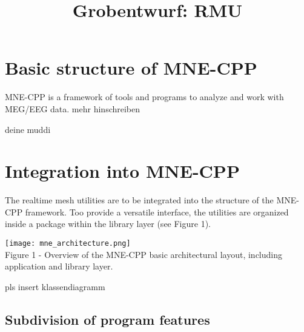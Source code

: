 \documentclass[a4paper, 11pt, ngerman, fleqn]{article}
\begin{document}
	
\title{Grobentwurf: RMU}
\vspace{3 in}
\maketitle
\clearpage

\tableofcontents

\clearpage
\section{Basic structure of MNE-CPP}

MNE-CPP is a framework of tools and programs to analyze and work with MEG/EEG data.
mehr hinschreiben 

\begin{description}
	\item[deine muddi]

\end{description}

\clearpage

\section{Integration into MNE-CPP}

The realtime mesh utilities are to be integrated into the structure of the MNE-CPP framework. Too provide a versatile interface, the utilities are organized inside a package within the library layer (see Figure 1).

\begin{center}
	\texttt{[image: mne\_architecture.png]}
	\\
	{Figure 1 - Overview of the MNE-CPP basic architectural layout, including application and library layer.}
\end{center}

{pls insert klassendiagramm}

\subsection{Subdivision of program features}
\end{document}
